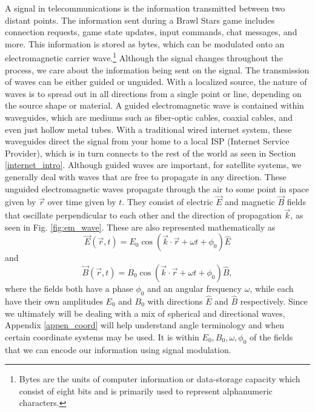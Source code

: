 \documentclass[10pt]{article}
\begin{document}
A signal in telecommunications is the information transmitted between two distant points\cite{dunlop2017telecommunications}. The information sent during a Brawl Stars game includes connection requests, game state updates, input commands, chat messages, and more. This information is stored as bytes, which can be modulated onto an electromagnetic carrier wave.\footnote{Bytes are the units of computer information or data-storage capacity which consist of eight bits and is primarily used to represent alphanumeric characters.} Although the signal changes throughout the process, we care about the information being sent on the signal. The transmission of waves can be either guided or unguided. With a localized source, the nature of waves is to spread out in all directions from a single point or line, depending on the source shape or material. A guided electromagnetic wave is contained within waveguides, which are mediums such as fiber-optic cables, coaxial cables, and even just hollow metal tubes. With a traditional wired internet system, these waveguides direct the signal from your home to a local ISP (Internet Service Provider), which is in turn connects to the rest of the world as seen in Section \ref{internet_intro}. Although guided waves are important, for satellite systems, we generally deal with waves that are free to propagate in any direction. These unguided electromagnetic waves propagate through the air to some point in space given by $\vec{r}$ over time given by $t$. They consist of electric $\vec{E}$ and magnetic $\vec{B}$ fields that oscillate perpendicular to each other and the direction of propagation $\vec{k}$, as seen in Fig. \ref{fig:em_wave}. These are also represented mathematically as
\begin{equation}
\vec{E}(\vec{r}, t) = E_0 \cos (\vec{k}\cdot \vec{r} + \omega t + \phi_0) \hat{E}
    \label{eq:electric_field}
\end{equation}
and
\begin{equation}
\vec{B}(\vec{r}, t) = B_0 \cos (\vec{k}\cdot \vec{r} + \omega t + \phi_0) \hat{B},
    \label{eq:magnetic_field}
\end{equation}
where the fields both have a phase $\phi_0$ and an angular frequency $\omega$, while each have their own amplitudes $E_0$ and $B_0$ with directions $\hat{E}$ and $\hat{B}$ respectively. Since we ultimately will be dealing with a mix of spherical and directional waves, Appendix \ref{appen_coord} will help understand angle terminology and when certain coordinate systems may be used. It is within $E_0,B_0,\omega,\phi_0$ of the fields that we can encode our information using signal modulation.
\end{document}
